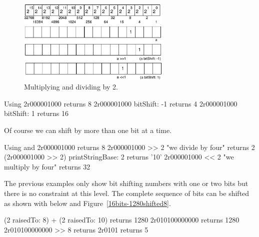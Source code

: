\documentclass[a4paper,10pt,twoside]{book}
\begin{document}
\begin{figure}[h]
\begin{center}
\includegraphics[width=0.65\textwidth]{16bits-numberMultiplication}
\caption{Multiplying and dividing by 2.\label{bitshiftmult}}
\end{center}
\end{figure}

\begin{code}{Using }
2r000001000 
	returns 8
2r000001000 bitShift: -1
	returns 4
2r000001000 bitShift: 1
	returns 16
\end{code}

Of course we can shift by more than one bit at a time. 

\begin{code}{Using \ct{>>} and \ct{<<}}
2r000001000 
	returns 8
2r000001000 >> 2					"we divide by four"
	returns 2
(2r000001000 >> 2) printStringBase: 2 
	returns '10'	
2r000001000 << 2					"we multiply by four"
	returns 32
\end{code}




The previous examples only show bit shifting numbers with one or two bits but there is no constraint at this level.
The complete sequence of bits can be shifted as shown with  below and Figure~\ref{16bits-1280shifted8}.

\begin{code}{}
(2 raisedTo: 8) + (2 raisedTo: 10) 
	returns 1280
2r010100000000
	returns 1280
2r010100000000 >> 8
	returns	2r0101
	returns 5
\end{code}


\end{document}
